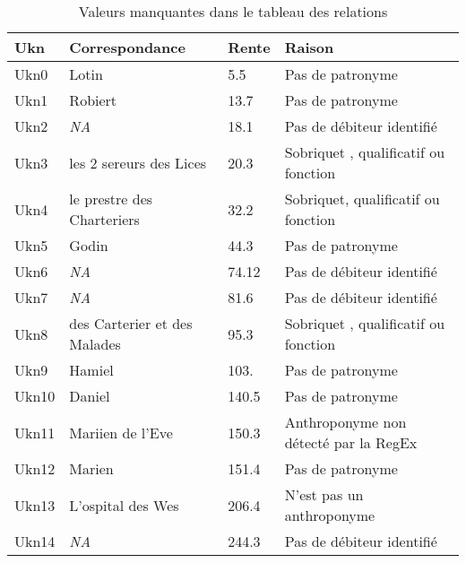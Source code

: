 \begin{table}
    \centering
    \begin{tabular}{|l|l|l|l|}
\hline	\textbf{Ukn}	&	\textbf{Correspondance}	&	\textbf{Rente}	& \textbf{Raison}		\\
\hline
\hline	Ukn0	&	Lotin	&	5.5	&	Pas de patronyme	\\
\hline	Ukn1	&	Robiert	&	13.7	&	Pas de patronyme	\\
\hline	Ukn2	&	\textit{NA}	&	18.1	&	Pas de débiteur identifié	\\
\hline	Ukn3	&	les 2 sereurs des Lices	&	20.3	&	Sobriquet , qualificatif ou fonction	\\
\hline	Ukn4	&	le prestre des Charteriers	&	32.2	&	Sobriquet, qualificatif ou fonction	\\
\hline	Ukn5	&	Godin	&	44.3	&	Pas de patronyme	\\
\hline	Ukn6	&	\textit{NA}	&	74.12	&	Pas de débiteur identifié	\\
\hline	Ukn7	&	\textit{NA}	&	81.6	&	Pas de débiteur identifié	\\
\hline	Ukn8	&	des Carterier et des Malades	&	95.3	&	Sobriquet , qualificatif ou fonction	\\
\hline	Ukn9	&	Hamiel	&	103.	&	Pas de patronyme	\\
\hline	Ukn10	&	Daniel	&	140.5	&	Pas de patronyme	\\
\hline	Ukn11	&	Mariien de l'Eve	&	150.3	&	Anthroponyme non détecté par la RegEx	\\
\hline	Ukn12	&	Marien	&	151.4	&	Pas de patronyme	\\
\hline	Ukn13	&	L'ospital des Wes	&	206.4	&	N'est pas un anthroponyme	\\
\hline	Ukn14	&	\textit{NA}	&	244.3	&	Pas de débiteur identifié	\\
\hline
    \end{tabular}
    \caption{Valeurs manquantes dans le tableau des relations}
    \label{ukn_node}
\end{table}
